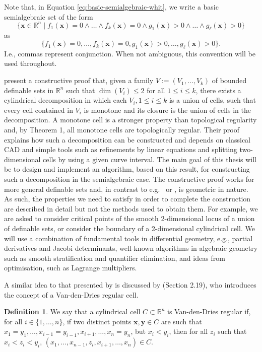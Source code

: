 \documentclass[
]{book}
\theoremstyle{definition}
\newtheorem{definition}{Definition}[chapter]
\theoremstyle{definition}
\theoremstyle{definition}
\theoremstyle{definition}
\theoremstyle{remark}
\begin{document}
Note that, in Equation \eqref{eq:basic-semialgebraic-whit}, we write a basic semialgebraic set of the form
\[
\{ \mathbf{x} \in \mathbb{R}^n \mid f_1(\mathbf{x}) = 0 \land \ldots \land f_k(\mathbf{x}) = 0 \land g_1(\mathbf{x}) > 0 \land \ldots \land g_\ell(\mathbf{x}) > 0 \}
\]
as
\[
\{ f_1(\mathbf{x}) = 0, \ldots, f_k(\mathbf{x}) = 0, g_1(\mathbf{x}) > 0, \ldots, g_\ell(\mathbf{x}) > 0 \}.
\]
I.e., commas represent conjunction. When not ambiguous, this convention will be used throughout.

\citet{bgv15} present a constructive proof that, given a family \(V := (V_1,\ldots,V_k)\) of bounded definable sets in \(\mathbb{R}^n\) such that \(\dim(V_i) \le 2\) for all \(1 \le i \le k\), there exists a cylindrical decomposition in which each \(V_i, 1 \le i \le k\) is a union of cells, such that every cell contained in \(V_i\) is monotone and its closure is the union of cells in the decomposition. A monotone cell is a stronger property than topological regularity and, by \citet{bgv13} Theorem 1, all monotone cells are topologically regular. Their proof explains how such a decomposition can be constructed and depends on classical CAD and simple tools such as refinements by linear equations and splitting two-dimensional cells by using a given curve interval.
The main goal of this thesis will be to design and implement an algorithm, based on this result, for constructing such a decomposition in the semialgebraic case.
The constructive proof works for more general definable sets and, in contrast to e.g.~\citet{collins1975} or \citet{lazard10}, is geometric in nature. As such, the properties we need to satisfy in order to complete the construction are described in detail but not the methods used to obtain them. For example, we are asked to consider critical points of the smooth 2-dimensional locus of a union of definable sets, or consider the boundary of a 2-dimensional cylindrical cell.
We will use a combination of fundamental tools in differential geometry, e.g., partial derivatives and Jacobi determinants, well-known algorithms in algebraic geometry such as smooth stratification and quantifier elimination, and ideas from optimisation, such as Lagrange multipliers.

A similar idea to that presented by \citet{bgv15} is discussed by \citet{vdd1998} (Section 2.19), who introduces the concept of a Van-den-Dries regular cell.

\begin{definition}
\citep[Section 2.19]{vdd1998}
We say that a cylindrical cell \(C \subset \mathbb{R}^n\) is Van-den-Dries regular if, for all \(i \in \{1,\ldots,n\}\), if two distinct points \(\mathbf{x},\mathbf{y} \in C\) are such that \(x_1 = y_1, \ldots, x_{i-1} = y_{i-1}, x_{i+1}, \ldots, x_n = y_n\), but \(x_i < y_i\), then for all \(z_i\) such that \(x_i < z_i < y_i\), \((x_1,\ldots,x_{n-1},z_i,x_{i+1},\ldots,x_n) \in C\).
\end{definition}
\end{document}
